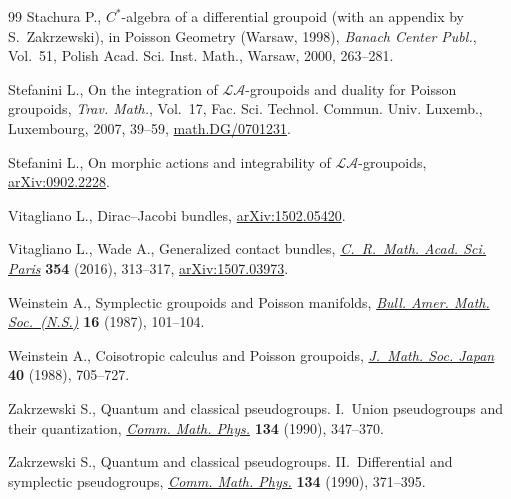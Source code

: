 \begin{thebibliography}{99}
Stachura P., {$C^*$}-algebra of a dif\/ferential groupoid (with an appendix by
 {S}.~{Z}akrzewski), in Poisson Geometry ({W}arsaw, 1998), \textit{Banach
 Center Publ.}, Vol.~51, Polish Acad. Sci. Inst. Math., Warsaw, 2000,
 263--281.


Stefanini L., On the integration of {$\mathcal{LA}$}-groupoids and duality for
 {P}oisson groupoids, \textit{Trav. Math.}, Vol.~17, Fac. Sci. Technol. Commun. Univ. Luxemb., Luxembourg,
 2007, 39--59, \href{https://arxiv.org/abs/math.DG/0701231}{math.DG/0701231}.

Stefanini L., On morphic actions and integrability of $\mathcal{LA}$-groupoids,
 \href{https://arxiv.org/abs/0902.2228}{arXiv:0902.2228}.

Vitagliano L., Dirac--{J}acobi bundles, \href{https://arxiv.org/abs/1502.05420}{arXiv:1502.05420}.

Vitagliano L., Wade A., Generalized contact bundles, \href{https://doi.org/10.1016/j.crma.2015.12.009}{\textit{C.~R.~Math. Acad.
 Sci. Paris}} \textbf{354} (2016), 313--317, \href{https://arxiv.org/abs/1507.03973}{arXiv:1507.03973}.

Weinstein A., Symplectic groupoids and {P}oisson manifolds, \href{https://doi.org/10.1090/S0273-0979-1987-15473-5}{\textit{Bull. Amer.
 Math. Soc.~(N.S.)}} \textbf{16} (1987), 101--104.

Weinstein A., Coisotropic calculus and {P}oisson groupoids, \href{https://doi.org/10.2969/jmsj/04040705}{\textit{J.~Math.
 Soc. Japan}} \textbf{40} (1988), 705--727.

Zakrzewski S., Quantum and classical pseudogroups. {I}.~{U}nion pseudogroups
 and their quantization, \href{https://doi.org/10.1007/bf02097706}{\textit{Comm. Math. Phys.}} \textbf{134} (1990),
 347--370.

Zakrzewski S., Quantum and classical pseudogroups. {II}.~{D}if\/ferential and
 symplectic pseudogroups, \href{https://doi.org/10.1007/bf02097707}{\textit{Comm. Math. Phys.}} \textbf{134} (1990),
 371--395.

\end{thebibliography}
